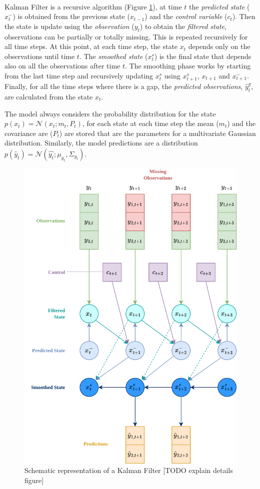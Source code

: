 \documentclass{article}
\newcommand{\norm}[3]{\mathcal{N}\left(#1; #2, #3\right)} %
\begin{document}
\paragraph{} Kalman Filter is a recursive algorithm (Figure \ref{fig:kalman_filter}), at time $t$ the \textit{predicted state} ($x^-_t$) is obtained from the previous state ($x_{t-1}$) and the \textit{control variable} ($c_t$). Then the state is update using the \textit{observation} ($y_t$) to obtain the \textit{filtered state}, observations can be partially or totally missing. This is repeated recursively for all time steps. At this point, at each time step, the state $x_t$ depends only on the observations until time $t$. The \textit{smoothed state} ($x^s_t$) is the final state that depends also on all the observations after time $t$. The smoothing phase works by starting from the last time step and recursively updating $x^s_t$ using $x^s_{t+1}$, $x_{t+1}$ and $x^-_{t+1}$.
Finally, for all the time steps where there is a gap, the \textit{predicted observations}, $\hat{y}^g_t$, are calculated from the state $x_t$.

The model always considers the probability distribution for the state $p(x_t) = \norm{x_t}{m_t}{P_t}$, for each state at each time step the mean ($m_t$) and the covariance are ($P_t$) are stored that are the parameters for a multivariate Gaussian distribution. Similarly, the model predictions are a distribution $p(\hat{y}_t) =  \norm{\hat{y_t}}{\mu_{y_t}}{\Sigma_{y_t}}$.

\begin{figure}
\centerline{\includegraphics[width=4.5in]{Kalman Filter figure.png}}
\caption{Schematic representation of a Kalman Filter [TODO explain details figure]}
\label{fig:kalman_filter}
\end{figure}
\end{document}
